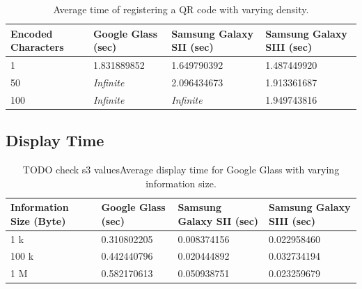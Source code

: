 	\begin{table}[H]%
    		\caption{Average time of registering a QR code with varying density.} \label{tab:complexityAverage}
		\centering \begin{tabularx}{\textwidth}{l|X|X|X} \hline
		\textbf{Encoded Characters} & \textbf{Google Glass (sec)} & \textbf{Samsung Galaxy SII (sec)} & \textbf{Samsung Galaxy SIII (sec)} \\ \hline \hline
       
		1	&1.831889852	&1.649790392	&1.487449920	\\ \hline
		50	&\textit{Infinite}	&2.096434673	&1.913361687	\\ \hline
		100	&\textit{Infinite}	&\textit{Infinite}	&1.949743816	\\ \hline
		
		\end{tabularx}
	\end{table}

\subsection{Display Time}

	\begin{table}[ht!]
    		\caption{TODO check s3 valuesAverage display time for Google Glass with varying information size.} \label{tab:averageDisplaySpeedGoogleGlass}
		\centering \begin{tabularx}{\textwidth}{l|X|X|X} \hline
		\textbf{Information Size (Byte)} & \textbf{Google Glass (sec)}  & \textbf{Samsung Galaxy SII (sec)}  & \textbf{Samsung Galaxy SIII (sec)} \\ \hline \hline
       
		1 k		&0.310802205	&0.008374156	&0.022958460	 \\ \hline
		100 k 	&0.442440796	&0.020444892	&0.032734194	 \\ \hline
		1 M		&0.582170613	&0.050938751	&0.023259679	 \\ \hline

		\end{tabularx}
	\end{table}




